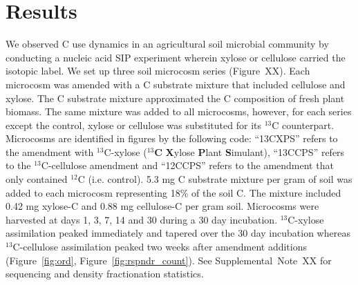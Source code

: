 \section{Results}
We observed C use dynamics in an agricultural soil microbial community by
conducting a nucleic acid SIP experiment wherein xylose or cellulose carried
the isotopic label. We set up three soil microcosm series (Figure~XX). Each
microcosm was amended with a C substrate mixture that included cellulose and
xylose. The C substrate mixture approximated the C composition of fresh plant
biomass. The same mixture was added to all microcosms, however, for each series
except the control, xylose or cellulose was substituted for its $^{13}$C
counterpart. Microcosms are identified in figures by the following code:
``13CXPS'' refers to the amendment with $^{13}$C-xylose ($^{13}$\textbf{C}
\textbf{X}ylose \textbf{P}lant \textbf{S}imulant), ``13CCPS'' refers to the
$^{13}$C-cellulose amendment and ``12CCPS'' refers to the amendment that only
contained $^{12}$C (i.e. control). 5.3 mg C substrate mixture per gram of soil
was added to each microcosm representing 18\% of the soil C. The mixture
included 0.42 mg xylose-C and 0.88 mg cellulose-C per gram soil. Microcosms
were harvested at days 1, 3, 7, 14 and 30 during a 30 day incubation.
$^{13}$C-xylose assimilation peaked immediately and tapered over the 30 day
incubation whereas $^{13}$C-cellulose assimilation peaked two weeks after
amendment additions (Figure~\ref{fig:ord}, Figure~\ref{fig:rspndr_count}). See
Supplemental~Note~XX for sequencing and density fractionation statistics.

